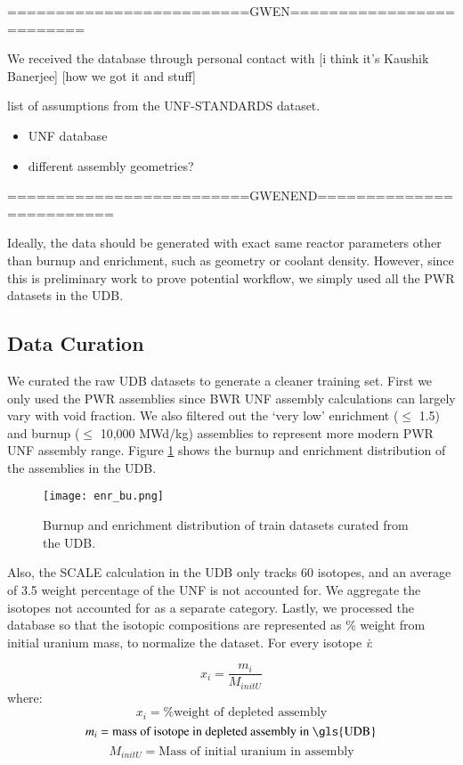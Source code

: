 =========================GWEN=========================

We received the database through personal contact
with [i think it's Kaushik Banerjee] [how we got it and stuff]

list of assumptions from the \gls{UNF-STANDARDS} dataset.
\begin{itemize}
    \item UNF database
    \item different assembly geometries?
\end{itemize}

=========================GWENEND=========================

Ideally, the data should be generated with exact same reactor
parameters other than burnup and enrichment, such as geometry or
coolant density. However, since
this is preliminary work to prove potential workflow, we
simply used all the \gls{PWR} datasets in the \gls{UDB}.

\subsection{Data Curation}

We curated the raw \gls{UDB} datasets to generate
a cleaner training set. First we only used the 
\gls{PWR} assemblies since \gls{BWR} \gls{UNF} assembly
calculations can largely vary with void fraction.
We also filtered out the
`very low' enrichment ($\leq$ 1.5) and
burnup ($\leq$ 10,000 MWd/kg)
assemblies to represent more modern \gls{PWR} \gls{UNF}
assembly range. Figure \ref{fig:enr_bu} shows the
burnup and enrichment distribution of the assemblies in the
\gls{UDB}.


\begin{figure}
    \centering
    \texttt{[image: enr\_bu.png]}
    \caption{Burnup and enrichment distribution of train
             datasets curated from the \gls{UDB}.}
    \label{fig:enr_bu}
\end{figure}


Also, the SCALE calculation in the \gls{UDB} only tracks 60 isotopes,
and an average of 3.5 weight percentage of the \gls{UNF} is not accounted for. We
aggregate the isotopes not accounted for as a separate category. Lastly,
we processed the database so that the isotopic compositions are 
represented as \% weight from initial uranium mass, to normalize
the dataset. For every isotope \textit{i}:

\begin{equation}
x_i = \frac{m_i}{M_{initU}}
\end{equation}
where:
\[
x_i = \text{\% weight of depleted assembly}
\]
\[
m_i = \text{mass of isotope in depleted assembly in \gls{UDB}}
\]
\[
M_{initU} = \text{Mass of initial uranium in assembly}
\]



